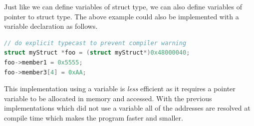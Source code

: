 Just like we can define variables of struct type, we can also define variables of pointer to struct type.
The above example could also be implemented with a variable declaration as follows. 

\begin{lstlisting}[language=C, frame=trBL]
// do explicit typecast to prevent compiler warning
struct myStruct *foo = (struct myStruct*)0x48000040;
foo->member1 = 0x5555;
foo->member3[4] = 0xAA;
\end{lstlisting}

This implementation using a variable is \emph{less} efficient as it requires a pointer variable to be allocated in memory and accessed. With the previous implementations which did not use a variable all of the addresses are resolved at compile time which makes the program faster and smaller. 
